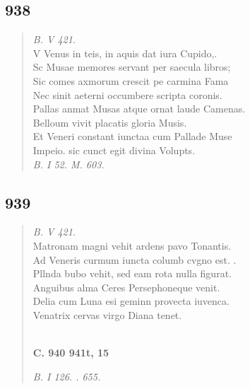 \documentclass[11pt, a4paper]{report}
\begin{document}
            \subsection*{938}
      \begin{verse}
      \textit{B. V 421.} \\ V Venus in teis, in aquis dat iura Cupido,. \\ Sc Musae memores servant per saecula libros; \\ Sic comes axmorum crescit pe carmina Fama \\ Nec sinit aeterni occumbere scripta coronis. \\ Pallas anmat Musas atque ornat laude Camenas. \\ Belloum vivit placatis gloria Musis. \\ Et Veneri constant iunctaa cum Pallade Muse \\ Impeio. sic cunct egit divina Volupts. \\ \textit{B. I 52. M. 603.} \\ 
      \end{verse}
  
            \subsection*{939}
      \begin{verse}
      \textit{B. V 421.} \\ Matronam magni vehit ardens pavo Tonantis. \\ Ad Veneris curmum iuncta columb cvgno est. . \\ Pllnda bubo vehit, sed eam rota nulla figurat. \\ Anguibus alma Ceres Persephoneque venit. \\ Delia cum Luna esi geminn provecta iuvenca. \\ Venatrix cervas virgo Diana tenet. \\ 
        ﻿\pagebreak 
    \begin{center} \textbf{C. 940 941t, 15} \end{center} \marginpar{[361]} \textit{B. I 126. . 655.} \\ 
      \end{verse}
  
\end{document}
